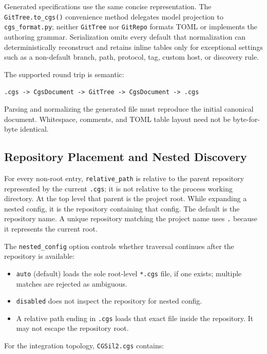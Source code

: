 Generated specifications use the same concise representation. The
\texttt{GitTree.to\_cgs()} convenience method delegates model projection to
\texttt{cgs\_format.py}; neither \texttt{GitTree} nor \texttt{GitRepo} formats
TOML or implements the authoring grammar. Serialization omits every default
that normalization can deterministically reconstruct and retains inline tables
only for exceptional settings such as a non-default branch, path, protocol,
tag, custom host, or discovery rule.

The supported round trip is semantic:

\begin{center}
\texttt{.cgs -> CgsDocument -> GitTree -> CgsDocument -> .cgs}
\end{center}

Parsing and normalizing the generated file must reproduce the initial
canonical document. Whitespace, comments, and TOML table layout need not be
byte-for-byte identical.

\subsection{Repository Placement and Nested Discovery}

For every non-root entry, \texttt{relative\_path} is relative to the parent
repository represented by the current \texttt{.cgs}; it is not relative to
the process working directory. At the top level that parent is the project
root. While expanding a nested config, it is the repository containing that
config. The default is the repository name. A unique repository matching the
project name uses \texttt{.} because it represents the current root.

The \texttt{nested\_config} option controls whether traversal continues after
the repository is available:

\begin{itemize}
  \item \texttt{auto} (default) loads the sole root-level \texttt{*.cgs} file,
        if one exists; multiple matches are rejected as ambiguous.
  \item \texttt{disabled} does not inspect the repository for nested config.
  \item A relative path ending in \texttt{.cgs} loads that exact file inside
        the repository. It may not escape the repository root.
\end{itemize}

For the integration topology, \texttt{CGSil2.cgs} contains:

